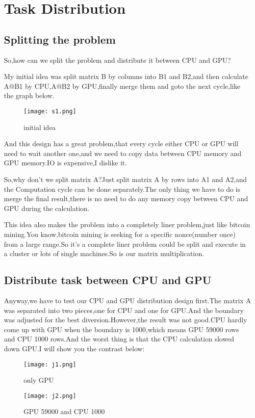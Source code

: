 \documentclass[12pt]{scrartcl} %
\begin{document}
\section{Task Distribution}
\subsection{Splitting the problem}
So,how can we split the problem and distribute it between CPU and GPU?

My initial idea was split matrix B by columns into B1 and B2,and then calculate A@B1 by CPU,A@B2 by GPU,finally merge them and goto the next cycle,like the graph below.
\begin{figure}[H]
    \centering
    \texttt{[image: s1.png]}
    \label{}
    \caption{initial idea}
\end{figure}

And this design has a great problem,that every cycle either CPU or GPU will need to wait another one,and we need to copy data between CPU memory and GPU memory.IO is expensive,I dislike it.

So,why don't we split matrix A?Just split matrix A by rows into A1 and A2,and the Computation cycle can be done separately.The only thing we have to do is merge the final result,there is no need to do any memory copy between CPU and GPU during the calculation.

This idea also makes the problem into a completely liner problem,just like bitcoin mining.You know,bitcoin mining is seeking for a specific nonce(number once) from a large range.So it's a complete liner problem could be split and execute in a cluster or lots of single machines.So is our matrix multiplication.
\subsection{Distribute task between CPU and GPU}
Anyway,we have to test our CPU and GPU distribution design first.The matrix A was separated into two pieces,one for CPU and one for GPU.And the boundary was adjusted for the best diversion.However,the result was not good.CPU hardly come up with GPU when the boundary is 1000,which means GPU 59000 rows and CPU 1000 rows.And the worst thing is that the CPU calculation slowed down GPU.I will show you the contrast below:
\begin{figure}[H]
    \centering
    \texttt{[image: j1.png]}
    \caption{only GPU}
    \label{}
\end{figure}
\begin{figure}[H]
    \centering
    \texttt{[image: j2.png]}
    \caption{GPU 59000 and CPU 1000}
    \label{}
\end{figure}
\end{document}
